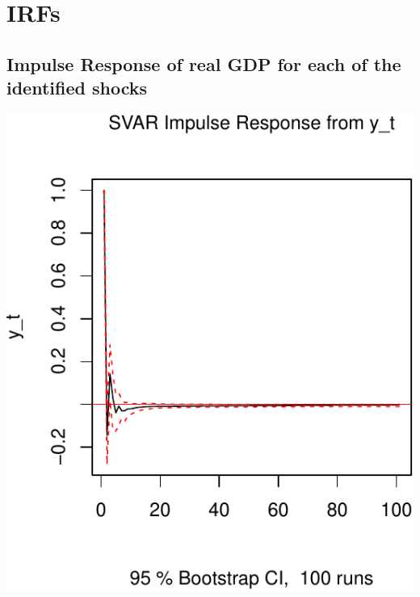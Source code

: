 \documentclass[11pt,preprint, authoryear]{elsarticle}
\numberwithin{equation}{section}
\numberwithin{figure}{section}
\numberwithin{table}{section}
\begin{document}
\hypertarget{irfs}{%
\section{IRFs}\label{irfs}}

\hypertarget{impulse-response-of-real-gdp-for-each-of-the-identified-shocks}{%
\subsection{Impulse Response of real GDP for each of the identified
shocks}\label{impulse-response-of-real-gdp-for-each-of-the-identified-shocks}}

\includegraphics{TS_proj_files/figure-latex/unnamed-chunk-14-1.pdf}
\end{document}
